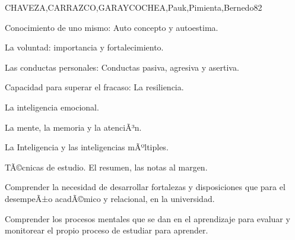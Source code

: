 \begin{syllabus}
\begin{unit}{}{CHAVEZA,CARRAZCO,GARAYCOCHEA,Pauk,Pimienta,Bernedo}{8}{2}
\begin{topics}
        \item Conocimiento de uno mismo: Auto concepto y autoestima.
        \item La voluntad: importancia y fortalecimiento.
        \item Las conductas personales: Conductas pasiva, agresiva y asertiva.
        \item Capacidad para superar el fracaso: La resiliencia.
        \item La inteligencia emocional.
        \item La mente, la memoria  y la atenciÃ³n.
        \item La Inteligencia y las inteligencias mÃºltiples. 
        \item TÃ©cnicas de  estudio. El resumen, las notas al margen.       
\end{topics}
\begin{unitgoals}
        \item Comprender la necesidad de desarrollar  fortalezas y disposiciones que para el desempeÃ±o acadÃ©mico y relacional, en la universidad.
        \item Comprender los procesos mentales que se dan en el aprendizaje para evaluar y monitorear el propio proceso de estudiar para aprender.
\end{unitgoals}
\end{unit}


\end{syllabus}
